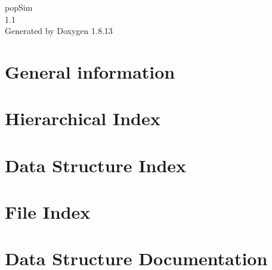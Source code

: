 \documentclass[twoside]{book}
\newcommand{\+}{\discretionary{\mbox{\scriptsize$\hookleftarrow$}}{}{}}
\newcommand{\clearemptydoublepage}{%
  \newpage{\pagestyle{empty}\cleardoublepage}%
}
\begin{document}
\hypersetup{pageanchor=false,
             bookmarksnumbered=true,
             pdfencoding=unicode
            }
\begin{titlepage}
\vspace*{7cm}
\begin{center}%
{\Large pop\+Sim \\[1ex]\large 1.\+1 }\\
\vspace*{1cm}
{\large Generated by Doxygen 1.8.13}\\
\end{center}
\end{titlepage}
\clearemptydoublepage
{}
\tableofcontents
\clearemptydoublepage
{}
\hypersetup{pageanchor=true}

\chapter{General information}
\label{index}\hypertarget{index}{}
\chapter{Hierarchical Index}

\chapter{Data Structure Index}

\chapter{File Index}

\chapter{Data Structure Documentation}







































\end{document}
